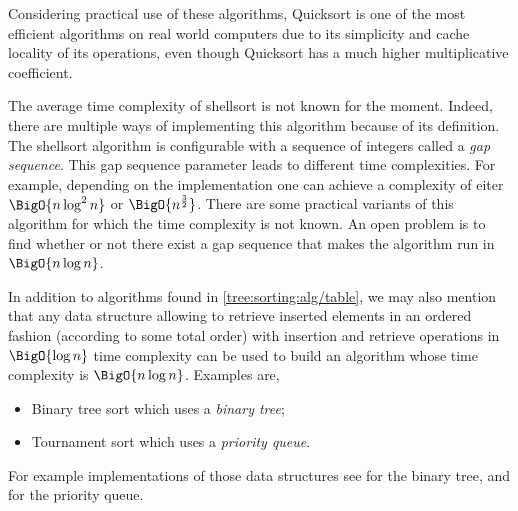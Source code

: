 Considering practical use of these algorithms, Quicksort is one of the most
efficient algorithms on real world computers due to its simplicity and cache
locality of its operations, even though Quicksort has a much higher
multiplicative coefficient.

The average time complexity of shellsort is not known for the moment. Indeed,
there are multiple ways of implementing this algorithm because of its
definition. The shellsort algorithm is configurable with a sequence of integers
called a \emph{gap sequence}. This gap sequence parameter leads to different
time complexities. For example, depending on the implementation one can achieve
a complexity of eiter $\BigO{n \log^2 n}$ or $\BigO{n^{\frac{3}{2}}}$. There
are some practical variants of this algorithm for which the time complexity is
not known. An open problem is to find whether or not there exist a gap sequence
that makes the algorithm run in $\BigO{n \log n}$.

In addition to algorithms found in \ref{tree:sorting:alg/table}, we may also
mention that any data structure allowing to retrieve inserted elements in an
ordered fashion (according to some total order) with insertion and retrieve
operations in $\BigO{\log n}$ time complexity can be used to build an algorithm
whose time complexity is $\BigO{n \log n}$. Examples are,

\begin{itemize}
\item Binary tree sort which uses a \emph{binary tree};
\item Tournament sort which uses a \emph{priority queue}.
\end{itemize}

For example implementations of those data structures see
\citet*{sleator1985self} for the binary tree, and
\citet*{leiserson2001introduction} for the priority queue.

